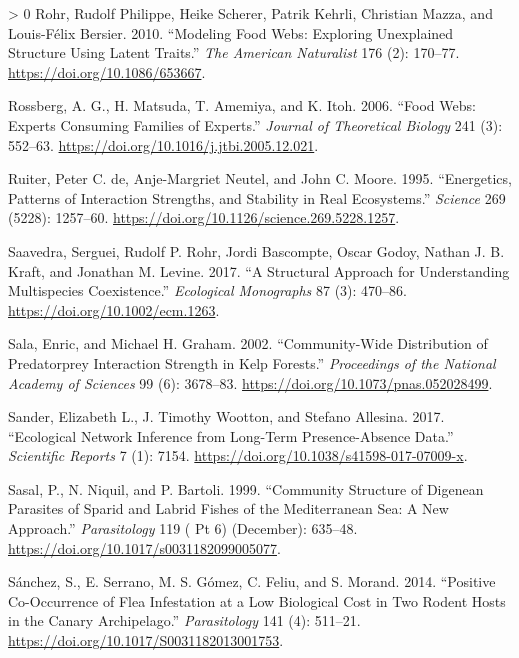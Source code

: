 \documentclass[11pt]{article}
\newlength{\cslhangindent}
\newenvironment{CSLReferences}[3] %
 {%
  \setlength{\parindent}{0pt}
  \ifodd #1 \everypar{\setlength{\hangindent}{\cslhangindent}}\ignorespaces\fi
  \ifnum #2 > 0
  \setlength{\parskip}{#2\baselineskip}
  \fi
 }%
 {}
\begin{document}
\begin{CSLReferences}{1}{0}
\leavevmode\hypertarget{ref-Rohr2010ModFoo}{}%
Rohr, Rudolf Philippe, Heike Scherer, Patrik Kehrli, Christian Mazza,
and Louis-Félix Bersier. 2010. {``Modeling Food Webs: Exploring
Unexplained Structure Using Latent Traits.''} \emph{The American
Naturalist} 176 (2): 170--77. \url{https://doi.org/10.1086/653667}.

\leavevmode\hypertarget{ref-Rossberg2006FooWeb}{}%
Rossberg, A. G., H. Matsuda, T. Amemiya, and K. Itoh. 2006. {``Food
Webs: Experts Consuming Families of Experts.''} \emph{Journal of
Theoretical Biology} 241 (3): 552--63.
\url{https://doi.org/10.1016/j.jtbi.2005.12.021}.

\leavevmode\hypertarget{ref-Ruiter1995EnePat}{}%
Ruiter, Peter C. de, Anje-Margriet Neutel, and John C. Moore. 1995.
{``Energetics, Patterns of Interaction Strengths, and Stability in Real
Ecosystems.''} \emph{Science} 269 (5228): 1257--60.
\url{https://doi.org/10.1126/science.269.5228.1257}.

\leavevmode\hypertarget{ref-Saavedra2017StrApp}{}%
Saavedra, Serguei, Rudolf P. Rohr, Jordi Bascompte, Oscar Godoy, Nathan
J. B. Kraft, and Jonathan M. Levine. 2017. {``A Structural Approach for
Understanding Multispecies Coexistence.''} \emph{Ecological Monographs}
87 (3): 470--86. \url{https://doi.org/10.1002/ecm.1263}.

\leavevmode\hypertarget{ref-Sala2002ComDis}{}%
Sala, Enric, and Michael H. Graham. 2002. {``Community-Wide Distribution
of Predatorprey Interaction Strength in Kelp Forests.''}
\emph{Proceedings of the National Academy of Sciences} 99 (6): 3678--83.
\url{https://doi.org/10.1073/pnas.052028499}.

\leavevmode\hypertarget{ref-Sander2017EcoNet}{}%
Sander, Elizabeth L., J. Timothy Wootton, and Stefano Allesina. 2017.
{``Ecological Network Inference from Long-Term Presence-Absence Data.''}
\emph{Scientific Reports} 7 (1): 7154.
\url{https://doi.org/10.1038/s41598-017-07009-x}.

\leavevmode\hypertarget{ref-Sasal1999ComStr}{}%
Sasal, P., N. Niquil, and P. Bartoli. 1999. {``Community Structure of
Digenean Parasites of Sparid and Labrid Fishes of the Mediterranean Sea:
A New Approach.''} \emph{Parasitology} 119 ( Pt 6) (December): 635--48.
\url{https://doi.org/10.1017/s0031182099005077}.

\leavevmode\hypertarget{ref-Sanchez2014PosCoo}{}%
Sánchez, S., E. Serrano, M. S. Gómez, C. Feliu, and S. Morand. 2014.
{``Positive Co-Occurrence of Flea Infestation at a Low Biological Cost
in Two Rodent Hosts in the Canary Archipelago.''} \emph{Parasitology}
141 (4): 511--21. \url{https://doi.org/10.1017/S0031182013001753}.


\end{CSLReferences}
\end{document}
